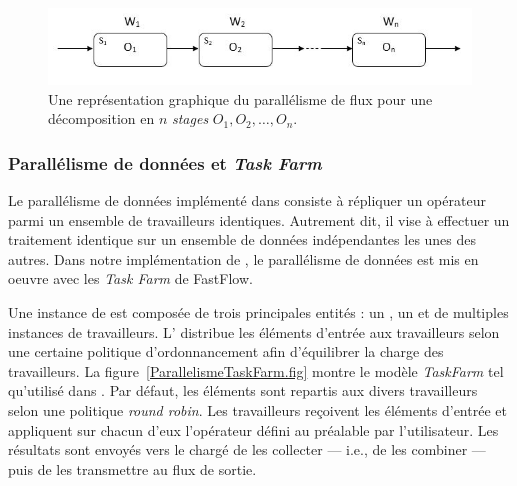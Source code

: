

\begin{figure}[ht]
\centering
     \includegraphics[width=1.0\textwidth]{Figures/ParallelismeDuFlux.jpg}
      \caption{Une repr\'esentation graphique du parall\'elisme de flux pour une d\'ecomposition en $n$ \emph{stages} $O_1, O_2, \ldots, O_n$.}
       \label{ParallelismeDuFlux.fig}
\end{figure}


\subsubsection{Parall\'elisme de donn\'ees et \emph{Task Farm}}


Le parall\'elisme de donn\'ees impl\'ement\'e dans   consiste \`a r\'epliquer un op\'erateur parmi un ensemble de travailleurs identiques. Autrement dit, il vise \`a effectuer un traitement identique sur un ensemble de donn\'ees ind\'ependantes les unes des autres. 
%
Dans notre impl\'ementation de \PpFf, le parall\'elisme de donn\'ees est mis en oeuvre avec les \emph{Task Farm} de FastFlow.



Une instance de  est compos\'ee de trois principales entit\'es : un , un  et de multiples instances de travailleurs. L' distribue les \'el\'ements d'entr\'ee aux travailleurs selon une certaine politique d'ordonnancement afin d'\'equilibrer la charge des travailleurs. La figure~\ref{ParallelismeTaskFarm.fig} montre le mod\`ele \emph{TaskFarm} tel qu'utilis\'e dans . Par d\'efaut, les \'el\'ements sont repartis aux divers travailleurs selon une politique \emph{round robin}. Les travailleurs re\c{c}oivent les \'el\'ements d'entr\'ee et appliquent sur chacun d'eux l'op\'erateur d\'efini au pr\'ealable par l'utilisateur. Les r\'esultats sont envoy\'es vers le  charg\'e de les collecter --- i.e., de les combiner --- puis de les transmettre au flux de sortie.

